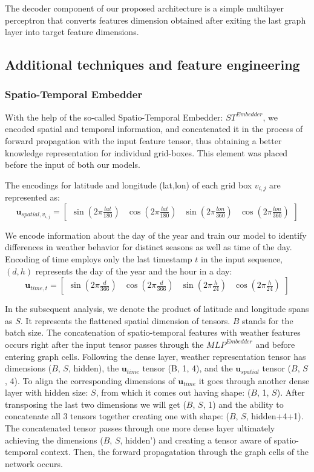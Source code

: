 The decoder component of our proposed architecture is a simple multilayer perceptron that converts features dimension obtained after exiting the last graph layer into target feature dimensions.

\subsection{Additional techniques and feature engineering}\label{chap:feat_eng}

\subsubsection{Spatio-Temporal Embedder} \label{stembedder}
With the help of the so-called Spatio-Temporal Embedder: $ST^{Embedder}$, we encoded spatial and temporal information, and concatenated it in the process of forward propagation with the input feature tensor, thus obtaining a better knowledge representation for individual grid-boxes. This element was placed before the input of both our models.

The encodings for latitude and longitude (lat,lon) of each grid box $v_{i,j}$ are represented as:
\[
\mathbf{u}_{spatial, v_{i,j}} =
\begin{bmatrix}
    \sin{(2\pi\frac{lat}{180})} &
    \cos{(2\pi\frac{lat}{180})} &
    \sin{(2\pi\frac{lon}{360})} &
    \cos{(2\pi\frac{lon}{360})}
\end{bmatrix}
\]

We encode information about the day of the year and train our model to identify differences in weather behavior for distinct seasons as well as time of the day. Encoding of time employs only the last timestamp $t$ in the input sequence, $(d, h)$ represents the day of the year and the hour in a day: 
\[
\mathbf{u}_{time,t} =
\begin{bmatrix}
    \sin{(2\pi\frac{d}{366})} &
    \cos{(2\pi\frac{d}{366})} &
    \sin{(2\pi\frac{h}{24})} &
    \cos{(2\pi\frac{h}{24})}
\end{bmatrix}
\]

In the subsequent analysis, we denote the product of latitude and longitude spans as $S$. It represents the flattened spatial dimension of tensors. $B$ stands for the batch size. The concatenation of spatio-temporal features with weather features occurs right after the input tensor passes through the $MLP^{Embedder}$ and before entering graph cells. Following the dense layer, weather representation tensor has dimensions ($B$, $S$, hidden), the $\mathbf{u}_{time}$ tensor (B, 1, 4), and the $\mathbf{u}_{spatial}$ tensor ($B$, $S$, 4). To align the corresponding dimensions of $\mathbf{u}_{time}$ it goes through another dense layer with hidden size: $S$, from which it comes out having shape: ($B$, 1, $S$). After transposing the last two dimensions we will get ($B$, $S$, 1) and the ability to concatenate all 3 tensors together creating one with shape: ($B$, $S$, hidden+4+1). The concatenated tensor passes through one more dense layer ultimately achieving the dimensions ($B$, $S$, hidden') and creating a tensor aware of spatio-temporal context. Then, the forward propagatation through the graph cells of the network occurs.

